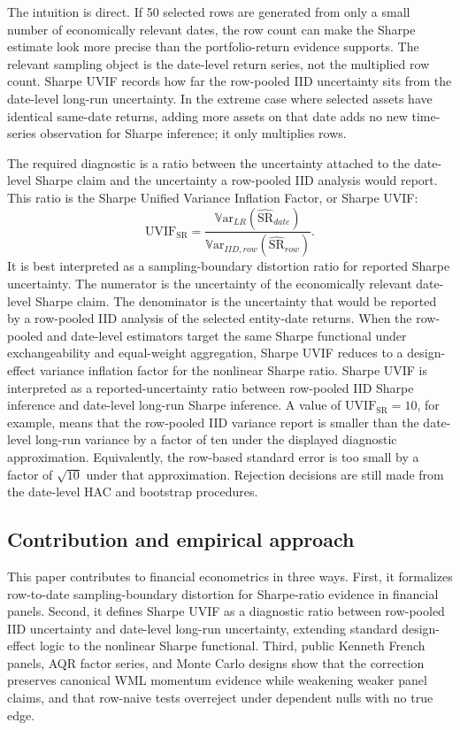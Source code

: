 \documentclass[12pt,a4paper]{article}
\newcommand{\Var}{\mathbb{V}\mathrm{ar}}
\newcommand{\SR}{\mathrm{SR}}
\newcommand{\UVIF}{\mathrm{UVIF}}
\begin{document}
The intuition is direct.  If 50 selected rows are generated from only a
small number of economically relevant dates, the row count can make the
Sharpe estimate look more precise than the portfolio-return evidence
supports.  The relevant sampling object is the date-level return series,
not the multiplied row count.  Sharpe UVIF records how far the
row-pooled IID uncertainty sits from the date-level long-run uncertainty.
In the extreme case where selected assets have identical same-date
returns, adding more assets on that date adds no new time-series
observation for Sharpe inference; it only multiplies rows.

The required diagnostic is a ratio between the uncertainty attached to
the date-level Sharpe claim and the uncertainty a row-pooled IID analysis
would report.  This ratio is the Sharpe Unified Variance Inflation
Factor, or Sharpe UVIF:
\[
  \UVIF_{\SR}
  =
  \frac{\Var_{LR}(\widehat{\SR}_{date})}
       {\Var_{IID,row}(\widehat{\SR}_{row})}.
\]
It is best interpreted as a sampling-boundary distortion ratio for
reported Sharpe uncertainty.  The numerator is the uncertainty of the
economically relevant date-level Sharpe claim.  The denominator is the
uncertainty that would be reported by a row-pooled IID analysis of the
selected entity-date returns.  When the row-pooled and date-level
estimators target the same Sharpe functional under exchangeability and
equal-weight aggregation, Sharpe UVIF reduces to a design-effect
variance inflation factor for the nonlinear Sharpe ratio.  Sharpe UVIF
is interpreted as a reported-uncertainty ratio between row-pooled IID
Sharpe inference and date-level long-run Sharpe inference.
A value of \(\UVIF_{\SR}=10\), for example, means that the row-pooled
IID variance report is smaller than the date-level long-run variance by
a factor of ten under the displayed diagnostic approximation.  Equivalently,
the row-based standard error is too small by a factor of \(\sqrt{10}\)
under that approximation.  Rejection decisions are still made from the
date-level HAC and bootstrap procedures.

\subsection{Contribution and empirical approach}

This paper contributes to financial econometrics in three ways.  First,
it formalizes row-to-date sampling-boundary distortion for Sharpe-ratio
evidence in financial panels.  Second, it defines Sharpe UVIF as a
diagnostic ratio between row-pooled IID uncertainty and date-level
long-run uncertainty, extending standard design-effect logic to the
nonlinear Sharpe functional.  Third, public Kenneth French panels, AQR
factor series, and Monte Carlo designs show that the correction preserves
canonical WML momentum evidence while weakening weaker panel claims, and
that row-naive tests overreject under dependent nulls with no true edge.
\end{document}
